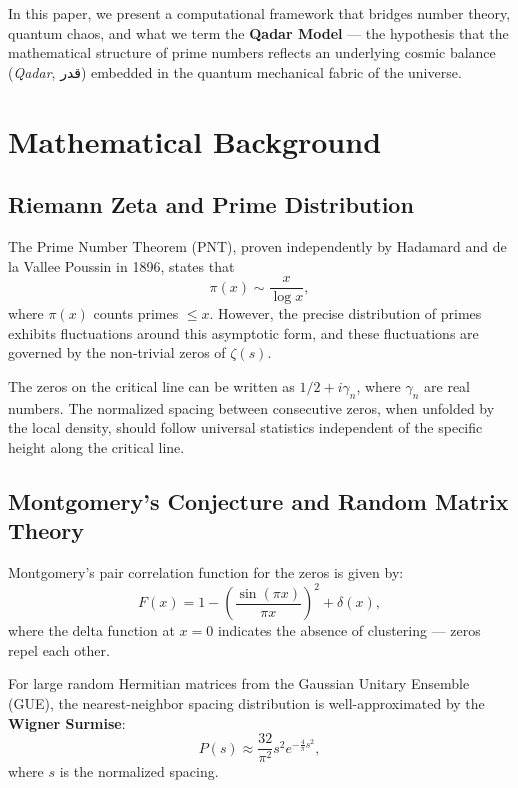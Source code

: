 \documentclass[12pt,a4paper]{article}
\begin{document}
In this paper, we present a computational framework that bridges number theory, quantum chaos, and what we term the \textbf{Qadar Model} — the hypothesis that the mathematical structure of prime numbers reflects an underlying cosmic balance (\textit{Qadar}, قدر) embedded in the quantum mechanical fabric of the universe.

\section{Mathematical Background}

\subsection{Riemann Zeta and Prime Distribution}

The Prime Number Theorem (PNT), proven independently by Hadamard and de la Vallee Poussin in 1896, states that
\begin{equation}
\pi(x) \sim \frac{x}{\log x},
\end{equation}
where $\pi(x)$ counts primes $\leq x$. However, the precise distribution of primes exhibits fluctuations around this asymptotic form, and these fluctuations are governed by the non-trivial zeros of $\zeta(s)$.

The zeros on the critical line can be written as $1/2 + i\gamma_n$, where $\gamma_n$ are real numbers. The normalized spacing between consecutive zeros, when unfolded by the local density, should follow universal statistics independent of the specific height along the critical line.

\subsection{Montgomery's Conjecture and Random Matrix Theory}

Montgomery's pair correlation function for the zeros is given by:
\begin{equation}
F(x) = 1 - \left(\frac{\sin(\pi x)}{\pi x}\right)^2 + \delta(x),
\end{equation}
where the delta function at $x=0$ indicates the absence of clustering — zeros repel each other.

For large random Hermitian matrices from the Gaussian Unitary Ensemble (GUE), the nearest-neighbor spacing distribution is well-approximated by the \textbf{Wigner Surmise}:
\begin{equation}
P(s) \approx \frac{32}{\pi^2} s^2 e^{-\frac{4}{\pi} s^2},
\end{equation}
where $s$ is the normalized spacing.
\end{document}

